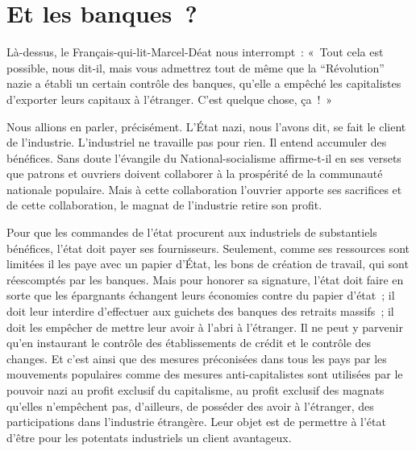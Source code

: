 \documentclass[french,twoside]{book} %
\begin{document}
\section[Et les banques ?]{Et les banques ?}
\noindent Là-dessus, le Français-qui-lit-Marcel-Déat nous interrompt : « Tout cela est possible, nous dit-il, mais vous admettrez tout de même que la “Révolution” nazie a établi un certain contrôle des banques, qu’elle a empêché les capitalistes d’exporter leurs capitaux à l’étranger. C’est quelque chose, ça ! »\par
Nous allions en parler, précisément. L’État nazi, nous l’avons dit, se fait le client de l’industrie. L’industriel ne travaille pas pour rien. Il entend accumuler des bénéfices. Sans doute l’évangile du National-socialisme affirme-t-il en ses versets que patrons et ouvriers doivent collaborer à la prospérité de la communauté nationale populaire. Mais à cette collaboration l’ouvrier apporte ses sacrifices et de cette collaboration, le magnat de l’industrie retire son profit.\par
Pour que les commandes de l’état procurent aux industriels de substantiels bénéfices, l’état doit payer ses fournisseurs. Seulement, comme ses ressources sont limitées il les paye avec un papier d’État, les bons de création de travail, qui sont réescomptés par les banques. Mais pour honorer sa signature, l’état doit faire en sorte que les épargnants échangent leurs économies contre du papier d’état ; il doit leur interdire d’effectuer aux guichets des banques des retraits massifs ; il doit les empêcher de mettre leur avoir à l’abri à l’étranger. Il ne peut y parvenir qu’en instaurant le contrôle des établissements de crédit et le contrôle des changes. Et c’est ainsi que des mesures préconisées dans tous les pays par les mouvements populaires comme des mesures anti-capitalistes sont utilisées par le pouvoir nazi au profit exclusif du capitalisme, au profit exclusif des magnats qu’elles n’empêchent pas, d’ailleurs, de posséder des avoir à l’étranger, des participations dans l’industrie étrangère. Leur objet est de permettre à l’état d’être pour les potentats industriels un client avantageux.
\end{document}
